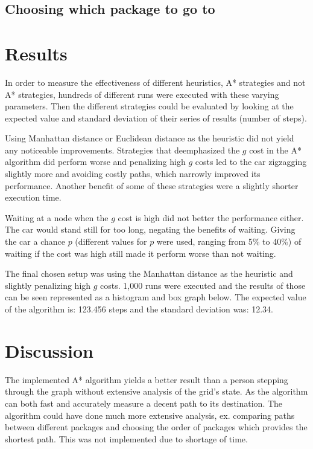 \documentclass[12pt, a4paper]{article}
\begin{document}
\subsection{Choosing which package to go to}

\section{Results}

In order to measure the effectiveness of different heuristics, A* strategies and not A* strategies, hundreds of different runs were executed with these varying parameters. Then the different strategies could be evaluated by looking at the expected value and standard deviation of their series of results (number of steps). 

Using Manhattan distance or Euclidean distance as the heuristic did not yield any noticeable improvements. Strategies that deemphasized the $g$ cost in the A* algorithm did perform worse and penalizing high $g$ costs led to the car zigzagging slightly more and avoiding costly paths, which narrowly improved its performance. Another benefit of some of these strategies were a slightly shorter execution time.


Waiting at a node when the $g$ cost is high did not better the performance either. The car would stand still for too long, negating the benefits of waiting. Giving the car a chance $p$ (different values for $p$ were used, ranging from 5\% to 40\%) of waiting if the cost was high still made it perform worse than not waiting.


The final chosen setup was using the Manhattan distance as the heuristic and slightly penalizing high $g$ costs. 1,000 runs were executed and the results of those can be seen represented as a histogram and box graph below. The expected value of the algorithm is: 123.456 steps and the standard deviation was: 12.34. 


\section{Discussion}

The implemented A* algorithm yields a better result than a person stepping through the graph without extensive analysis of the grid's state. As the algorithm can both fast and accurately measure a decent path to its destination. The algorithm could have done much more extensive analysis, ex. comparing paths between different packages and choosing the order of packages which provides the shortest path. This was not implemented due to shortage of time.
\end{document}
